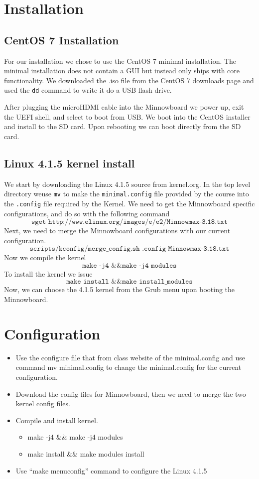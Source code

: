 \documentclass[onecolumn, draftclsnofoot,10pt, compsoc]{IEEEtran}
\begin{document}
  \section{Installation}
  \subsection{CentOS 7 Installation}
  For our installation we chose to use the CentOS 7 minimal installation. The minimal installation does not contain a GUI but instead only ships with core functionality.
  We downloaded the .iso file from the CentOS 7 downloads page and used the \texttt{dd} command to write it do a USB flash drive.
  
  After plugging the microHDMI cable into the Minnowboard we power up, exit the UEFI shell, and select to boot from USB.
  We boot into the CentOS installer and install to the SD card. Upon rebooting we can boot directly from the SD card.
  
  \subsection{Linux 4.1.5 kernel install}
  We start by downloading the Linux 4.1.5 source from kernel.org. In the top level directory weuse \texttt{mv} to make the \texttt{minimal.config} file provided by the course into the \texttt{.config} file required by the Kernel.
  We need to get the Minnowboard specific configurations, and do so with the following command \[\texttt{wget http://www.elinux.org/images/e/e2/Minnowmax-3.18.txt}\]
  Next, we need to merge the Minnowboard configurations with our current configuration.
  \[\texttt{scripts/kconfig/merge\_config.sh .config Minnowmax-3.18.txt}\]
  Now we compile the kernel \[\texttt{make -j4 \&\& make -j4 modules}\]
  To install the kernel we issue \[\texttt{make install \&\& make install\_modules}\]
  Now, we can choose the 4.1.5 kernel from the Grub menu upon booting the Minnowboard.
    
\section{Configuration}
  \begin{itemize}
      \item Use the configure file that from class website of the minimal.config and use command mv minimal.config to change the minimal.config for the current configuration.
      \item Download the config files for Minnowboard, then we need to merge the two kernel config files.
      \item Compile and install kernel.
      \begin{itemize}
        \item make -j4 \&\& make -j4 modules
        \item make install \&\& make modules install
      \end{itemize}
      \item Use “make menuconfig” command to configure the Linux 4.1.5
    \end{itemize}
    
\end{document}
